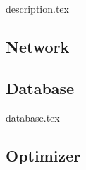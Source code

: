 {description.tex}

\subsection{Network} \label{sec:NN}

\subsection{Database} \label{sec:DB}
{database.tex}

\subsection{Optimizer} \label{sec:opt}
